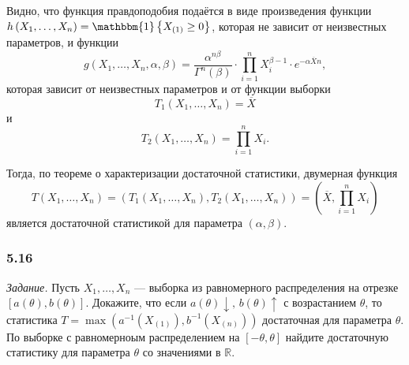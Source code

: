 Видно,
что функция правдоподобия подаётся в виде произведения функции
$h \left( X_1, \dotsc, X_n \right) = \mathbbm{1} \left\{ X_{ \left( 1 \right) } \geq 0 \right\} $,
которая не зависит от неизвестных параметров, и функции
$$g \left( X_1, \dotsc, X_n, \alpha, \beta \right) =
  \frac{ \alpha^{n \beta }}{ \Gamma^n \left( \beta \right) } \cdot
  \prod \limits_{i = 1}^n X_i^{ \beta - 1} \cdot e^{- \alpha \overline{X} n},$$
которая зависит от неизвестных параметров и от функции выборки
$$T_1 \left( X_1, \dotsc, X_n \right) = \overline{X}$$ и
$$T_2 \left( X_1, \dotsc, X_n \right) = \prod \limits_{i = 1}^n X_i.$$

Тогда, по теореме о характеризации достаточной статистики,
двумерная функция
$$T \left( X_1, \dotsc, X_n \right) =
  \left( T_1 \left( X_1, \dotsc, X_n \right), T_2 \left( X_1, \dotsc, X_n \right) \right) =
  \left( \overline{X}, \prod \limits_{i = 1}^n X_i \right) $$
является достаточной статистикой для параметра $ \left( \alpha, \beta \right) $.

\subsubsection*{5.16}

\textit{Задание.}
Пусть $X_1, \dotsc, X_n$ ---
выборка из равномерного распределения на отрезке
$ \left[ a \left( \theta \right), b \left( \theta \right) \right] $.
Докажите,
что если $a \left( \theta \right) \downarrow, \, b \left( \theta \right) \uparrow $
с возрастанием $ \theta $,
то статистика
$T =
  \max \left(
    a^{-1} \left( X_{ \left( 1 \right) } \right), b^{-1} \left( X_{ \left( n \right) } \right)
  \right) $
достаточная для параметра $ \theta $.
По выборке с равномерноым распределением на $ \left[ - \theta, \theta \right] $
найдите достаточную статистику для параметра $ \theta $ со значениями в $ \mathbb{R}$.

